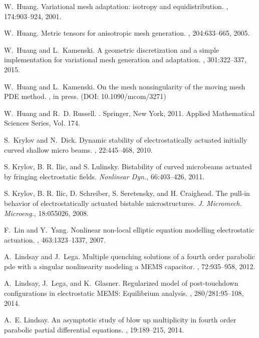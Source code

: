 \documentclass{siamart0516}
\theoremstyle{plain}%
\theoremstyle{definition}
\theoremstyle{remark}
\begin{document}
\begin{thebibliography}{10}
W.~Huang.
\newblock Variational mesh adaptation: isotropy and equidistribution.
, 174:903--924, 2001.

W.~Huang.
\newblock Metric tensors for anisotropic mesh generation.
, 204:633--665, 2005.

W.~Huang and L.~Kamenski.
\newblock A geometric discretization and a simple implementation for
  variational mesh generation and adaptation.
, 301:322--337, 2015.

W.~Huang and L.~Kamenski.
\newblock On the mesh nonsingularity of the moving mesh {PDE} method.
, in press.
\newblock (DOI: 10.1090/mcom/3271)

W.~Huang and R.~D. Russell.
.
\newblock Springer, New York, 2011.
\newblock Applied Mathematical Sciences Series, Vol. 174.

S.~Krylov and N.~Dick.
\newblock Dynamic stability of electrostatically actuated initially curved
  shallow micro beams.
, 22:445--468, 2010.

 S. Krylov, B. R. Ilic, and S. Lulinsky.
Bistability of curved microbeams actuated by fringing electrostatic fields.
{\em Nonlinear Dyn.},  66:403--426, 2011.

 S. Krylov, B. R. Ilic, D. Schreiber, S. Seretensky, and H. Craighead.
The pull-in behavior of electrostatically actuated bistable microstructures.
{\em J. Micromech. Microeng.}, 18:055026, 2008.

F.~Lin and Y.~Yang.
\newblock Nonlinear non-local elliptic equation modelling electrostatic actuation.
, 463:1323--1337, 2007.

A.~Lindsay and J.~Lega.
\newblock Multiple quenching solutions of a fourth order parabolic pde with a
  singular nonlinearity modeling a {MEMS} capacitor.
, 72:935--958, 2012.

A.~Lindsay, J.~Lega, and K.~Glasner.
\newblock Regularized model of post-touchdown configurations in electrostatic
  {MEMS}: Equilibrium analysis.
, 280/281:95--108, 2014.

A.~E. Lindsay.
\newblock An asymptotic study of blow up multiplicity in fourth order parabolic
  partial differential equations.
, 19:189--215, 2014.


\end{thebibliography}
\end{document}
